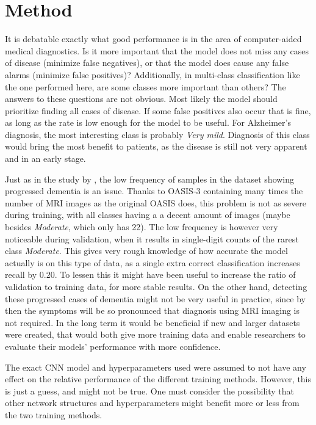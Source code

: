 \documentclass{kththesis}
\begin{document}
\section{Method}
It is debatable exactly what good performance is in the area of computer-aided medical diagnostics. Is it more important that the model does not miss any cases of disease (minimize false negatives), or that the model does cause any false alarms (minimize false positives)? Additionally, in multi-class classification like the one performed here, are some classes more important than others? The answers to these questions are not obvious. Most likely the model should prioritize finding all cases of disease. If some false positives also occur that is fine, as long as the rate is low enough for the model to be useful. For Alzheimer's diagnosis, the most interesting class is probably \textit{Very mild}. Diagnosis of this class would bring the most benefit to patients, as the disease is still not very apparent and in an early stage.

Just as in the study by \textcite{islam2018early}, the low frequency of samples in the dataset showing progressed dementia is an issue. Thanks to OASIS-3 containing many times the number of MRI images as the original OASIS does, this problem is not as severe during training, with all classes having a a decent amount of images (maybe besides \textit{Moderate}, which only has 22). The low frequency is however very noticeable during validation, when it results in single-digit counts of the rarest class \textit{Moderate}. This gives very rough knowledge of how accurate the model actually is on this type of data, as a single extra correct classification increases recall by $0.20$. To lessen this it might have been useful to increase the ratio of validation to training data, for more stable results. On the other hand, detecting these progressed cases of dementia might not be very useful in practice, since by then the symptoms will be so pronounced that diagnosis using MRI imaging is not required. In the long term it would be beneficial if new and larger datasets were created, that would both give more training data and enable researchers to evaluate their models' performance with more confidence.

The exact CNN model and hyperparameters used were assumed to not have any effect on the relative performance of the different training methods. However, this is just a guess, and might not be true. One must consider the possibility that other network structures and hyperparameters might benefit more or less from the two training methods.
\end{document}
